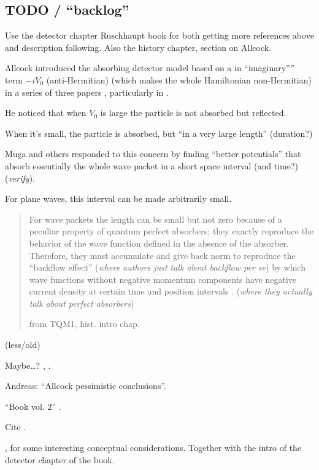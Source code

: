 \subsection*{TODO / ``backlog''}

Use the detector chapter Ruschhaupt book for both getting more references above and description following.
Also the history chapter, section on Allcock.

Allcock introduced the absorbing detector model based on a in ``imaginary'''' term $-iV_0$
(anti-Hermitian) (which makes the whole Hamiltonian non-Hermitian) in a series of three papers
\parencite{Allcock-1, Allcock-2, Allcock-3},
particularly in \cite[sec. II-IV]{Allcock-2}.

He noticed that when $V_0$ is large the particle is not absorbed but reflected.

When it's small, the particle is absorbed, but ``in a very large length'' (duration?)

Muga and others responded to this concern by finding ``better potentials'' that absorb essentially the
whole wave packet in a short space interval (and time?)
\parencite{Muga_TOAQM, Muga_CompositeAbsPot, ComplexAbsPot} (\emph{verify}).

For plane waves, this interval can be made arbitrarily small.

\begin{quotation}
  For wave packets the length can be small but not zero because of a
  peculiar property of quantum perfect absorbers; they exactly reproduce
  the behavior of the wave function defined in the absence of the absorber.
  Therefore, they must accumulate and give back norm to reproduce the
  ``backflow effect'' \parencite{Bracken_bf, Bracken_ProbTransport}
  (\emph{where authors just talk about backflow per se})
  by which wave functions without negative momentum components
  have negative current density at certain time and position intervals
  \parencite{Leavens_backflow}. (\emph{where they actually talk about perfect absorbers})

  from TQM1, hist. intro chap.
\end{quotation}

\cite{ComplexAbsPot}

\cite{Werner_ArrivalTime} (less/old)

Maybe\dots? \cite{ProbCurrent}, \cite{Ruschhaupt_QMoT}.

Andreas: ``Allcock pessimistic conclusions''.

``Book vol. 2'' \cite{TQM2:Detector}.

Cite \cite{Muga_ArrTimeOpNormal, Damborenea, Sudarshan_Zeno, Echanobe, Savvidou-1, Savvidou-2}.

\cite{Damborenea_atomic}, for some interesting conceptual considerations. Together with the
intro of the detector chapter of the book.